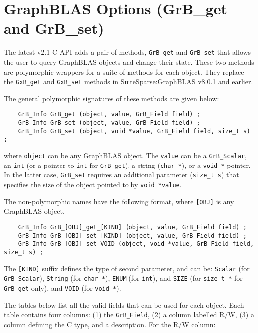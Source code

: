 
\section{GraphBLAS Options ({\sf GrB\_get} and {\sf GrB\_set})}
\label{options}

The latest v2.1 C API adds a pair of methods, \verb'GrB_get' and \verb'GrB_set'
that allows the user to query GraphBLAS objects and change their state.  These
two methods are polymorphic wrappers for a suite of methods for each object.
They replace the \verb'GxB_get' and \verb'GxB_set' methods in
SuiteSparse:GraphBLAS v8.0.1 and earlier.

The general polymorphic signatures of these methods are given below:

{\footnotesize
\begin{verbatim}
    GrB_Info GrB_get (object, value, GrB_Field field) ;
    GrB_Info GrB_set (object, value, GrB_Field field) ;
    GrB_Info GrB_set (object, void *value, GrB_Field field, size_t s) ; \end{verbatim}}

\noindent
where \verb'object' can be any GraphBLAS object.  The \verb'value' can be a
\verb'GrB_Scalar', an \verb'int' (or a pointer to \verb'int' for
\verb'GrB_get'), a string (\verb'char *'), or a \verb'void *' pointer.  In the
latter case, \verb'GrB_set' requires an additional parameter (\verb'size_t s')
that specifies the size of the object pointed to by \verb'void *value'.

The non-polymorphic names have the following format, where \verb'[OBJ]'
is any GraphBLAS object. 

{\footnotesize
\begin{verbatim}
    GrB_Info GrB_[OBJ]_get_[KIND] (object, value, GrB_Field field) ;
    GrB_Info GrB_[OBJ]_set_[KIND] (object, value, GrB_Field field) ;
    GrB_Info GrB_[OBJ]_set_VOID (object, void *value, GrB_Field field, size_t s) ; \end{verbatim}}

The \verb'[KIND]' suffix defines the type of second parameter, and can be:
    \verb'Scalar' (for \verb'GrB_Scalar'),
    \verb'String' (for \verb'char *'),
    \verb'ENUM' (for \verb'int'), and
    \verb'SIZE' (for \verb'size_t *' for \verb'GrB_get' only), and
    \verb'VOID' (for \verb'void *').

The tables below list all the valid fields that can be used for each object. 
Each table contains four columns:  (1) the \verb'GrB_Field',
(2) a column labelled R/W, (3) a column defining the C type, and a description.
For the R/W column:

